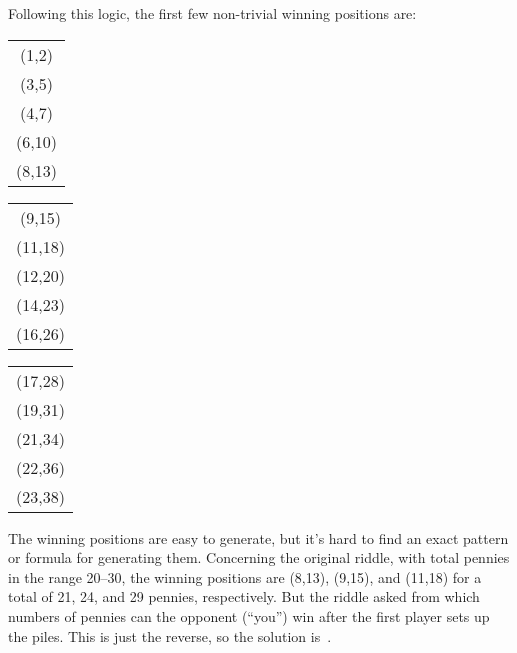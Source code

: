 \documentclass{article}
\begin{document}
\vspace{0.3in}
Following this logic, the first few non-trivial winning positions are:

\begin{center}
\begin{tabular}{c}
(1,2) \\
(3,5) \\
(4,7) \\
(6,10) \\
(8,13)
\end{tabular}
\qquad
\begin{tabular}{c}
(9,15) \\
(11,18) \\
(12,20) \\
(14,23) \\
(16,26)
\end{tabular}
\qquad
\begin{tabular}{c}
(17,28) \\
(19,31) \\
(21,34) \\
(22,36) \\
(23,38)
\end{tabular}
\end{center}

The winning positions are easy to generate, but it's hard to find an exact pattern or formula for generating them.
Concerning the original riddle, with total pennies in the range 20--30, the winning positions are (8,13), (9,15), and (11,18) for a total of 21, 24, and 29 pennies, respectively.
But the riddle asked from which numbers of pennies can the opponent (``you'') win after the first player sets up the piles.
This is just the reverse, so the solution is
\,.
\end{document}
